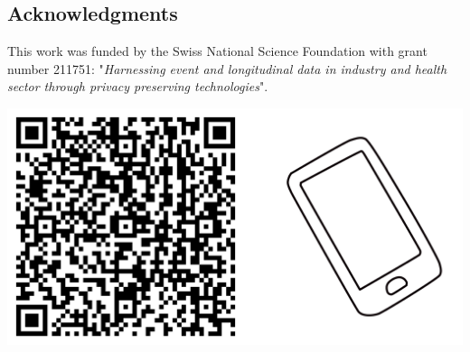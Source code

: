 \documentclass[a0,portrait]{a0poster}
\begin{document}
\begin{multicols}{3}
\singlespacing
\small
\nocite{*} %

\subsection{Acknowledgments}
\normalsize
This work was funded by the Swiss National Science Foundation with grant number 211751: "\textit{Harnessing event and longitudinal data in industry and health sector through privacy preserving technologies}".

\vspace{0.5cm}

\includegraphics[width=1\linewidth]{Poster TEX/style/qr-code.png}
 
\end{multicols}
\end{document}
